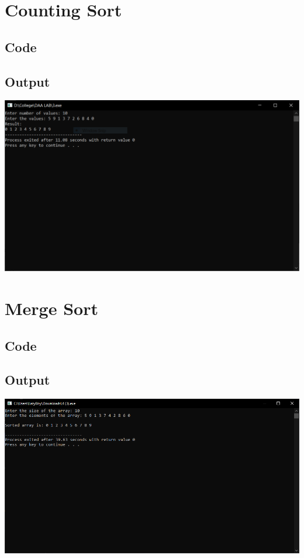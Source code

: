 \documentclass[11pt]{article}
\begin{document}
\section{Counting Sort}
	\subsection{Code}
		
	\subsection{Output}
		\includegraphics[scale=0.7]{pic/3.png}
\newpage











\section{Merge Sort}
	\subsection{Code}
		
	\subsection{Output}
		\includegraphics[scale=0.7]{pic/4.png}
\newpage
\end{document}
